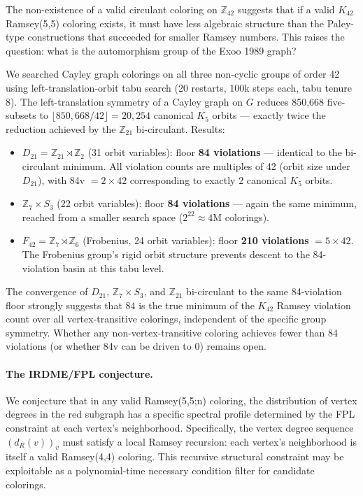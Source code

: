 \documentclass[11pt]{article}
\begin{document}
The non-existence of a valid circulant coloring on $\mathbb{Z}_{42}$ suggests
that if a valid $K_{42}$ Ramsey(5,5) coloring exists, it must have
less algebraic structure than the Paley-type constructions that succeeded for
smaller Ramsey numbers. This raises the question: what is the automorphism
group of the Exoo 1989 graph?

We searched Cayley graph colorings on all three non-cyclic groups of order 42
using left-translation-orbit tabu search (20 restarts, 100k steps each,
tabu tenure 8).
The left-translation symmetry of a Cayley graph on $G$ reduces 850,668 five-subsets
to $\lfloor 850{,}668 / 42 \rfloor = 20{,}254$ canonical $K_5$ orbits ---
exactly twice the reduction achieved by the $\mathbb{Z}_{21}$ bi-circulant.
Results:

\begin{itemize}
\item $D_{21} = \mathbb{Z}_{21} \rtimes \mathbb{Z}_2$ (31 orbit variables):
      floor \textbf{84 violations} --- identical to the bi-circulant minimum.
      All violation counts are multiples of 42 (orbit size under $D_{21}$),
      with 84v $= 2 \times 42$ corresponding to exactly 2 canonical $K_5$ orbits.
\item $\mathbb{Z}_7 \times S_3$ (22 orbit variables):
      floor \textbf{84 violations} --- again the same minimum,
      reached from a smaller search space ($2^{22} \approx 4$M colorings).
\item $F_{42} = \mathbb{Z}_7 \rtimes \mathbb{Z}_6$ (Frobenius, 24 orbit variables):
      floor \textbf{210 violations} $= 5 \times 42$. The Frobenius group's
      rigid orbit structure prevents descent to the 84-violation basin
      at this tabu level.
\end{itemize}

The convergence of $D_{21}$, $\mathbb{Z}_7 \times S_3$, and $\mathbb{Z}_{21}$
bi-circulant to the same 84-violation floor strongly suggests that 84 is the
true minimum of the $K_{42}$ Ramsey violation count over all vertex-transitive
colorings, independent of the specific group symmetry.
Whether any non-vertex-transitive coloring achieves fewer than 84 violations
(or whether 84v can be driven to 0) remains open.

\paragraph{The IRDME/FPL conjecture.}
We conjecture that in any valid Ramsey(5,5;n) coloring, the distribution of
vertex degrees in the red subgraph has a specific spectral profile determined
by the FPL constraint at each vertex's neighborhood. Specifically, the vertex
degree sequence $(d_R(v))_v$ must satisfy a local Ramsey recursion:
each vertex's neighborhood is itself a valid Ramsey(4,4) coloring.
This recursive structural constraint may be exploitable as a polynomial-time
necessary condition filter for candidate colorings.
\end{document}
